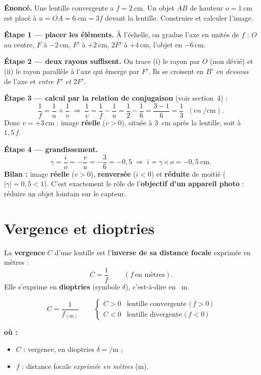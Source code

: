 \documentclass[11pt,a4paper]{article}
\newenvironment{ou}{%
  \par\smallskip\noindent\textbf{où :}\nopagebreak
  \begin{itemize}[leftmargin=1.8em,topsep=2pt,itemsep=1.5pt,parsep=0pt]}%
  {\end{itemize}}
\newcommand{\gamm}{\gamma}             %
\begin{document}
\begin{exemple}
\textbf{Énoncé.} Une lentille convergente a $f=\SI{2}{\centi\metre}$. Un objet $AB$ de hauteur
$o=\SI{1}{\centi\metre}$ est placé à $u=\overline{OA}=\SI{6}{\centi\metre}=3f$ devant la lentille.
Construire et calculer l'image.

\smallskip
\textbf{Étape 1 — placer les éléments.} À l'échelle, on gradue l'axe en unités de $f$ : $O$ au centre,
$F$ à $-2$\,cm, $F'$ à $+2$\,cm, $2F'$ à $+4$\,cm, l'objet en $-6$\,cm.

\smallskip
\textbf{Étape 2 — deux rayons suffisent.} On trace (i) le rayon par $O$ (non dévié) et (ii) le rayon
parallèle à l'axe qui émerge par $F'$. Ils se croisent en $B'$ \emph{en dessous} de l'axe et
\emph{entre $F'$ et $2F'$}.

\smallskip
\textbf{Étape 3 — calcul par la relation de conjugaison} (voir section~4) :
\[ \frac{1}{f}=\frac{1}{u}+\frac{1}{v}\;\Longrightarrow\;\frac{1}{v}=\frac{1}{f}-\frac{1}{u}
   =\frac{1}{2}-\frac{1}{6}=\frac{3-1}{6}=\frac{1}{3}\;\;(en\;\si{\per\centi\metre}). \]
Donc $v=+3$\,cm : image \textbf{réelle} ($v>0$), située à \SI{3}{\centi\metre} après la lentille,
soit à $1{,}5\,f$.

\smallskip
\textbf{Étape 4 — grandissement.}
\[ \gamm=\frac{i}{o}=-\frac{v}{u}=-\frac{3}{6}=-0{,}5 \;\Longrightarrow\; i=\gamm\times o=-0{,}5\ \text{cm}. \]
\textbf{Bilan :} image \textbf{réelle} ($v>0$), \textbf{renversée} ($i<0$) et \textbf{réduite} de
moitié ($|\gamm|=0{,}5<1$). C'est exactement le rôle de l'\textbf{objectif d'un appareil photo} :
réduire un objet lointain sur le capteur.
\end{exemple}

\section{Vergence et dioptries}
\begin{definition}
La \textbf{vergence} $C$ d'une lentille est l'\textbf{inverse de sa distance focale} exprimée en
mètres :
\[ \boxed{\,C=\dfrac{1}{f}\,}\qquad(f\ \text{en mètres}). \]
Elle s'exprime en \textbf{dioptries} (symbole $\delta$), c'est-à-dire en \si{\per\metre}.
\end{definition}

\begin{formule}
\[ \boxed{\,C=\dfrac{1}{f_{(\mathrm{m})}}\,}\qquad
   \begin{cases} C>0 & \text{lentille convergente (}\,f>0\,\text{)} \\ C<0 & \text{lentille divergente (}\,f<0\,\text{)} \end{cases} \]
\begin{ou}
  \item $C$ : vergence, en dioptries $\delta=\si{\per\metre}$ ;
  \item $f$ : distance focale \emph{exprimée en mètres} (\si{\metre}).
\end{ou}
\end{formule}
\end{document}

